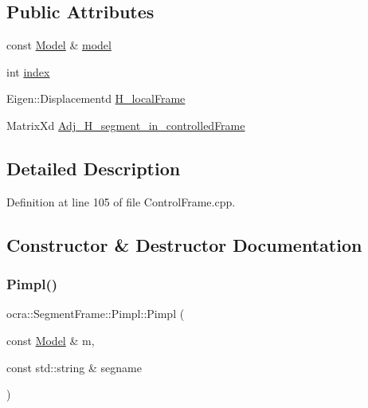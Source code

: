 \subsection*{Public Attributes}
\begin{DoxyCompactItemize}
\item 
const \hyperlink{classocra_1_1Model}{Model} \& \hyperlink{structocra_1_1SegmentFrame_1_1Pimpl_a787a1cc368ab12229ecd11358e2805e1}{model}
\item 
int \hyperlink{structocra_1_1SegmentFrame_1_1Pimpl_aeeadbd2b42d3e0cf750cbc0df50f213c}{index}
\item 
Eigen\+::\+Displacementd \hyperlink{structocra_1_1SegmentFrame_1_1Pimpl_a5e0d767dc540fbd56b1e6f125ba7abf6}{H\+\_\+local\+Frame}
\item 
Matrix\+Xd \hyperlink{structocra_1_1SegmentFrame_1_1Pimpl_a3b188df19a7b138373a1861dfa5aad1d}{Adj\+\_\+\+H\+\_\+segment\+\_\+in\+\_\+controlled\+Frame}
\end{DoxyCompactItemize}


\subsection{Detailed Description}


Definition at line 105 of file Control\+Frame.\+cpp.



\subsection{Constructor \& Destructor Documentation}
\hypertarget{structocra_1_1SegmentFrame_1_1Pimpl_a3e4a372b7ffde0baf617f8097a4d9285}{}\label{structocra_1_1SegmentFrame_1_1Pimpl_a3e4a372b7ffde0baf617f8097a4d9285} 
\subsubsection{\texorpdfstring{Pimpl()}{Pimpl()}\hspace{0.1cm}{\footnotesize\ttfamily [1/4]}}
{\footnotesize\ttfamily ocra\+::\+Segment\+Frame\+::\+Pimpl\+::\+Pimpl (\begin{DoxyParamCaption}\item[{const \hyperlink{classocra_1_1Model}{Model} \&}]{m,  }\item[{const std\+::string \&}]{segname }\end{DoxyParamCaption})\hspace{0.3cm}{\ttfamily [inline]}}



